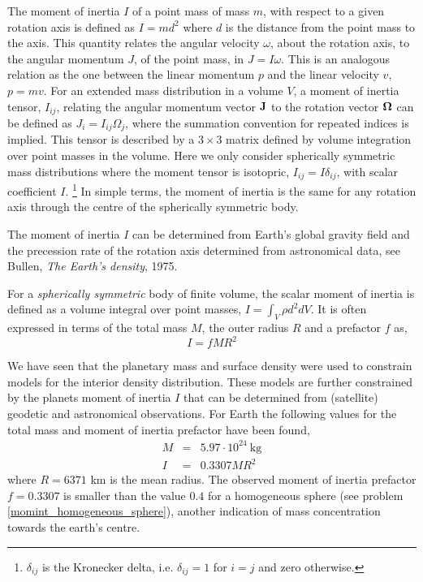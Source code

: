 
The moment of inertia $I$ of a point mass of mass $m$,
with respect to a given rotation axis is defined as $I = m d^2$
where $d$ is the distance from the point mass to the axis.
This quantity relates the angular velocity $\omega$, 
about the rotation axis,
to the angular momentum $J$, of the point mass, in $J = I \omega$.
This is an analogous relation as the one between the linear momentum $p$
and the linear velocity $v$, $p = m v$. 
For an extended mass distribution in a volume $V$,
a moment of inertia tensor, $I_{ij}$,
relating the angular momentum vector ${\bf J}$ to the rotation vector ${\bf \Omega}$
can be defined as $J_i = I_{ij} \Omega_j$, where the summation convention for repeated
indices is implied.
This tensor is described by a $3 \times 3$ matrix defined by volume integration
over point masses in the volume.
Here we only consider spherically symmetric mass distributions where
the moment tensor is isotopric, $I_{ij} = I \delta_{ij}$,
with scalar coefficient $I$.
\footnote{
$\delta_{ij}$ is the Kronecker delta, i.e. $\delta_{ij}=1$ for
$i=j$ and zero otherwise. }
In simple terms, the moment of inertia is the same for any rotation axis
through the centre of the spherically symmetric body.


The moment of inertia $I$ can be determined from Earth's global gravity
field and the precession rate of the rotation axis determined 
from astronomical data, see Bullen, {\it The Earth's density}, 1975.

For a {\it spherically symmetric} body of finite volume, 
the scalar moment of inertia is defined as
a volume integral over point masses,
$I = \int_V \rho d^2 dV$.
It is often expressed in terms of the total mass $M$, the outer radius $R$ 
and a prefactor $f$ as,
\begin{equation}
\boxed{    I = f M R^2}
\label{def_momint_prefact}
\end{equation}

We have seen that the planetary mass and surface density were used to
constrain models for the interior density distribution.
These models are further constrained by the planets moment of inertia $I$
that can be determined from (satellite) geodetic and astronomical
observations.
For Earth the following values for the total mass and moment of inertia
prefactor have been found,
\begin{eqnarray}
M &=& 5.97 \cdot 10 ^{24}~\mathrm{kg} \nonumber\\
I &=& 0.3307 M R^2   \nonumber
\end{eqnarray}
where $R = 6371$ km is the mean radius.
The observed moment of inertia prefactor $f=0.3307$ is smaller than the 
value $0.4$ for a homogeneous sphere 
(see problem \ref{momint_homogeneous_sphere}), 
another indication of mass concentration towards the earth's centre.

